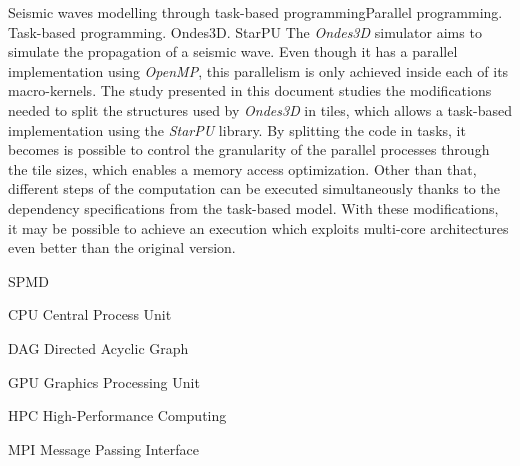 \documentclass[cic,tc]{iiufrgs}
\begin{document}
\begin{englishabstract}{Seismic waves modelling through task-based programming}{Parallel programming. Task-based programming. Ondes3D. StarPU}
  The \textit{Ondes3D} simulator aims to simulate the propagation of a seismic wave. Even though it has a parallel implementation using
  \textit{OpenMP}, this parallelism is only achieved inside each of its macro-kernels.
  The study presented in this document studies the modifications needed to split the structures used by \textit{Ondes3D} in tiles, which
  allows a task-based implementation using the \textit{StarPU} library.
  By splitting the code in tasks, it becomes is possible to control the granularity of the parallel processes through the tile sizes, which
  enables a memory access optimization. Other than that, different steps of the computation can be executed simultaneously thanks to the
  dependency specifications from the task-based model. With these modifications, it may be possible to achieve an execution which exploits
  multi-core architectures even better than the original version.
\end{englishabstract}

\listoffigures

\listoftables

\begin{listofabbrv}{SPMD}
\item[CPU] Central Process Unit
\item[DAG] Directed Acyclic Graph
\item[GPU] Graphics Processing Unit
\item[HPC] High-Performance Computing
\item[MPI] Message Passing Interface
\end{listofabbrv}


\tableofcontents
\end{document}
